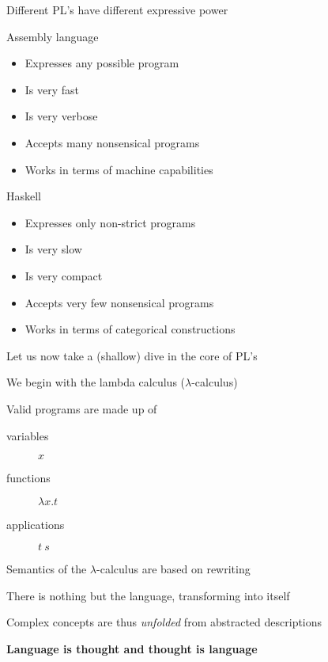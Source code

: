 \documentclass{beamer}
\begin{document}
\begin{slide}{
\item Different PL's have different expressive power
\item Assembly language
\begin{itemize}
\item Expresses any possible program
\item Is very fast
\item Is very verbose
\item Accepts many nonsensical programs
\item Works in terms of machine capabilities
\end{itemize}
\item Haskell
\begin{itemize}
\item Expresses only non-strict programs
\item Is very slow
\item Is very compact
\item Accepts very few nonsensical programs
\item Works in terms of categorical constructions
\end{itemize}
}\end{slide}

\begin{slide}{
\item Let us now take a (shallow) dive in the core of PL's
\item We begin with the lambda calculus ($\lambda$-calculus)
}\end{slide}

\begin{textslide}{
Valid programs are made up of
\begin{description}
\item[variables] $x$
\item[functions] $\lambda x.t$
\item[applications] $t\ s$
\end{description}
}\end{textslide}

\begin{slide}{
\item Semantics of the $\lambda$-calculus are based on rewriting
\item There is nothing but the language, transforming into itself
\item Complex concepts are thus \textit{unfolded} from abstracted descriptions
\item \textbf{Language is thought and thought is language}
}\end{slide}
\end{document}
